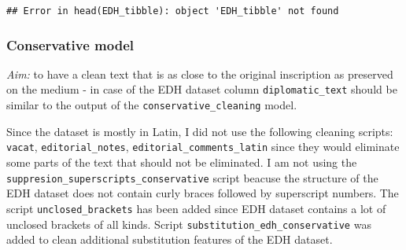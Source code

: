 \documentclass[]{article}
\begin{document}
\begin{verbatim}
## Error in head(EDH_tibble): object 'EDH_tibble' not found
\end{verbatim}

\hypertarget{conservative-model-1}{%
\subsubsection{Conservative model}\label{conservative-model-1}}

\emph{Aim:} to have a clean text that is as close to the original
inscription as preserved on the medium - in case of the EDH dataset
column \texttt{diplomatic\_text} should be similar to the output of the
\texttt{conservative\_cleaning} model.

Since the dataset is mostly in Latin, I did not use the following
cleaning scripts: \texttt{vacat}, \texttt{editorial\_notes},
\texttt{editorial\_comments\_latin} since they would eliminate some
parts of the text that should not be eliminated. I am not using the
\texttt{suppresion\_superscripts\_conservative} script beacuse the
structure of the EDH dataset does not contain curly braces followed by
superscript numbers. The script \texttt{unclosed\_brackets} has been
added since EDH dataset contains a lot of unclosed brackets of all
kinds. Script \texttt{substitution\_edh\_conservative} was added to
clean additional substitution features of the EDH dataset.
\end{document}
